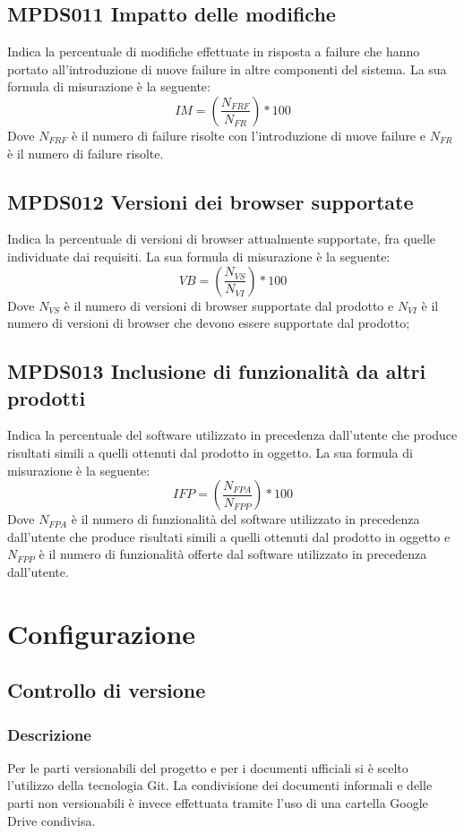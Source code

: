 \documentclass[NormeDiProgetto.tex]{subfiles}
\begin{document}
\subsection{MPDS011 Impatto delle modifiche} Indica la percentuale di modifiche effettuate in risposta a failure che hanno portato all'introduzione di nuove failure in altre componenti del sistema. La sua formula di misurazione è la seguente: \[IM=(\frac{N_{FRF}}{N_{FR}})*100\] Dove $ N_{FRF} $ è il numero di failure risolte con l'introduzione di nuove failure e $ N_{FR} $ è il numero di failure risolte.

\subsection{MPDS012 Versioni dei browser supportate} Indica la percentuale di versioni di browser attualmente supportate, fra quelle individuate dai requisiti. La sua formula di misurazione è la seguente: \[VB=(\frac{N_{VS}}{N_{VI}})*100\] Dove $ N_{VS} $ è il numero di versioni di browser supportate dal prodotto e $ N_{VI} $ è il numero di versioni di browser che devono essere supportate dal prodotto;
\subsection{MPDS013 Inclusione di funzionalità da altri prodotti} Indica la percentuale del software utilizzato in precedenza dall'utente che produce risultati simili a quelli ottenuti dal prodotto in oggetto. La sua formula di misurazione è la seguente: \[IFP=(\frac{N_{FPA}}{N_{FPP}})*100\] Dove $ N_{FPA} $ è il numero di funzionalità del software utilizzato in precedenza dall'utente che produce risultati simili a quelli ottenuti dal prodotto in oggetto e $ N_{FPP} $ è il numero di funzionalità offerte dal software utilizzato in precedenza dall'utente. 

	
	\section{Configurazione}
	
	\subsection{Controllo di versione}
	
	\subsubsection{Descrizione}
	Per le parti versionabili del progetto e per i documenti ufficiali si è scelto l'utilizzo della tecnologia Git.
	La condivisione dei documenti informali e delle parti non versionabili è invece effettuata tramite l'uso di una cartella Google Drive condivisa.
	
\end{document}
